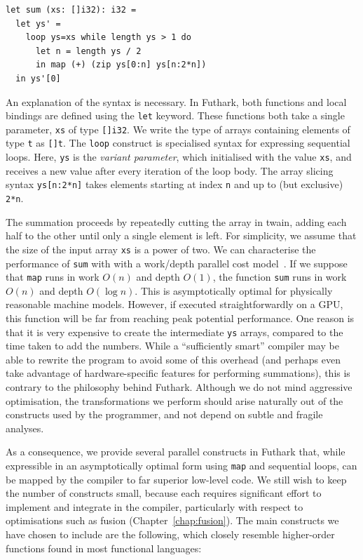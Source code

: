 \begin{lstlisting}
let sum (xs: []i32): i32 =
  let ys' =
    loop ys=xs while length ys > 1 do
      let n = length ys / 2
      in map (+) (zip ys[0:n] ys[n:2*n])
  in ys'[0]
\end{lstlisting}

An explanation of the syntax is necessary.  In Futhark, both functions
and local bindings are defined using the \lstinline{let} keyword.
These functions both take a single parameter, \lstinline{xs} of type
\lstinline{[]i32}.  We write the type of arrays containing elements of
type \lstinline{t} as \lstinline{[]t}.  The \lstinline{loop} construct
is specialised syntax for expressing sequential loops.  Here,
\lstinline{ys} is the \textit{variant parameter}, which initialised
with the value \lstinline{xs}, and receives a new value after every
iteration of the loop body.  The array slicing syntax
\lstinline{ys[n:2*n]} takes elements starting at index \lstinline{n}
and up to (but exclusive) \lstinline{2*n}.

The summation proceeds by repeatedly cutting the array in twain,
adding each half to the other until only a single element is left.
For simplicity, we assume that the size of the input array
\lstinline{xs} is a power of two.  We can characterise the performance
of \lstinline{sum} with with a work/depth parallel cost
model~\cite{Blelloch:1995:PSF:224164.224210}.  If we suppose that
\lstinline{map} runs in work $O(n)$ and depth $O(1)$, the function
\lstinline{sum} runs in work $O(n)$ and depth $O(\log n)$.  This is
asymptotically optimal for physically reasonable machine models.
However, if executed straightforwardly on a GPU, this function will be
far from reaching peak potential performance.  One reason is that it
is very expensive to create the intermediate \lstinline{ys} arrays,
compared to the time taken to add the numbers.  While a ``sufficiently
smart'' compiler may be able to rewrite the program to avoid some of
this overhead (and perhaps even take advantage of hardware-specific
features for performing summations), this is contrary to the
philosophy behind Futhark.  Although we do not mind aggressive
optimisation, the transformations we perform should arise naturally
out of the constructs used by the programmer, and not depend on subtle
and fragile analyses.

As a consequence, we provide several parallel constructs in Futhark
that, while expressible in an asymptotically optimal form using
\lstinline{map} and sequential loops, can be mapped by the compiler to
far superior low-level code.  We still wish to keep the number of
constructs small, because each requires significant effort to
implement and integrate in the compiler, particularly with respect to
optimisations such as fusion (Chapter~\ref{chap:fusion}).  The main
constructs we have chosen to include are the following, which closely
resemble higher-order functions found in most functional languages:

